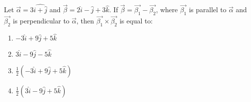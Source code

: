 \item Let $\overrightarrow{\alpha} = 3\hat{i + \hat{j}}$ and $\overrightarrow{\beta} = 2\hat{i} - \hat{j} + 3\hat{k}$. If $\overrightarrow{\beta} = \overrightarrow{\beta_1} - \overrightarrow{\beta_2}$, where $\overrightarrow{\beta_1}$ is parallel to $\overrightarrow{\alpha}$ and $\overrightarrow{\beta_2}$ is perpendicular to $\overrightarrow{\alpha}$, then $\overrightarrow{\beta_1} \times \overrightarrow{\beta_2}$ is equal to:
\begin{enumerate}
\item $-3\hat{i} + 9\hat{j} + 5\hat{k}$
\item $3\hat{i} - 9\hat{j} - 5\hat{k}$
\item $\frac{1}{2}(-3\hat{i} + 9\hat{j} + 5\hat{k})$
\item $\frac{1}{2}(3\hat{i} - 9\hat{j} + 5\hat{k})$
\end{enumerate}




































